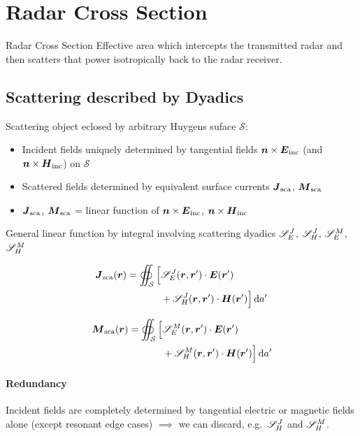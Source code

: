 \section{Radar Cross Section}

\begin{definition}{Radar Cross Section}
    Effective area which intercepts the transmitted radar and then scatters that power isotropically back to the radar receiver.
\end{definition}

\subsection{Scattering described by Dyadics}

Scattering object eclosed by arbitrary Huygens suface $\mathcal{S}$:
\begin{itemize}
        \item Incident fields uniquely determined by tangential fields $\bs{n}\times\bs{E}_{\mathrm{inc}}$ (and $\bs{n}\times\bs{H}_{\mathrm{inc}}$) on $\mathcal{S}$
        \item Scattered fields determined by equivalent surface currents $\bs{J}_{\mathrm{sca}}$, $\bs{M}_{\mathrm{sca}}$
        \item $\bs{J}_{\mathrm{sca}}$, $\bs{M}_{\mathrm{sca}}$ = linear function of $\bs{n}\times\bs{E}_{\mathrm{inc}}$, $\bs{n}\times\bs{H}_{\mathrm{inc}}$
\end{itemize}

General linear function by integral involving scattering dyadics $\DyadicS{E}{J}$, $\DyadicS{H}{J}$, $\DyadicS{E}{M}$, $\DyadicS{H}{M}$

\begin{align}
  \bs{J}_{\mathrm{sca}}(\bs{r}) = \oiint_{\mathcal{S}} \Big[ &\DyadicS{E}{J}\GreenRs \cdot \bs{E}(\bs{r}')\nonumber\\
  &+ \DyadicS{H}{J}\GreenRs\cdot\bs{H}(\bs{r}') \Big]\,\mathrm{d}a'
\end{align}

\begin{align}
  \bs{M}_{\mathrm{sca}}(\bs{r}) = \oiint_{\mathcal{S}} \Big[ &\DyadicS{E}{M}\GreenRs \cdot \bs{E}(\bs{r}')\nonumber\\
  &+ \DyadicS{H}{M}\GreenRs\cdot\bs{H}(\bs{r}') \Big]\,\mathrm{d}a'
\end{align}

\paragraph{Redundancy} Incident fields are completely determined by tangential electric or magnetic fields alone (except resonant edge cases) $\implies$ we can discard, e.g.\, $\DyadicS{H}{J}$ and $\DyadicS{H}{M}$.

